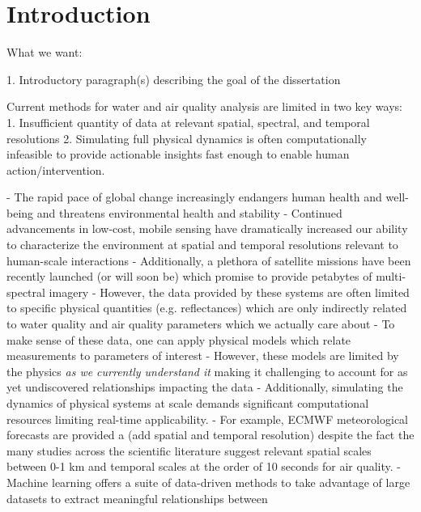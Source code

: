 

\chapter{Introduction}\label{ch:intro}



What we want:

1. Introductory paragraph(s) describing the goal of the dissertation

Current methods for water and air quality analysis are limited in two key ways:
1. Insufficient quantity of data at relevant spatial, spectral, and temporal
resolutions
2. Simulating full physical dynamics is often computationally infeasible to
provide actionable insights fast enough to enable human action/intervention.



- The rapid pace of global change increasingly endangers human health and well-being
and threatens environmental health and stability
- Continued advancements in low-cost, mobile sensing have dramatically increased
our ability to characterize the environment at spatial and temporal resolutions
relevant to human-scale interactions
- Additionally, a plethora of satellite missions have been recently launched (or
will soon be) which promise to provide petabytes of multi-spectral imagery
- However, the data provided by these systems are often limited to specific
physical quantities (e.g. reflectances) which are only indirectly related to water quality and air
quality parameters which we actually care about
- To make sense of these data, one can apply physical models which relate
measurements to parameters of interest
- However, these models are limited by the physics \textit{as we currently
  understand it} making it challenging to account for as yet undiscovered
relationships impacting the data 
- Additionally, simulating the dynamics of physical systems at scale demands 
significant computational resources limiting real-time applicability.
- For example, ECMWF meteorological forecasts are provided a (add spatial and
temporal resolution) despite the fact the many studies across the scientific
literature suggest relevant spatial scales between 0-1 km and temporal scales at
the order of 10 seconds for air quality.
- Machine learning offers a suite of data-driven methods to take advantage of
large datasets to extract meaningful relationships between 



